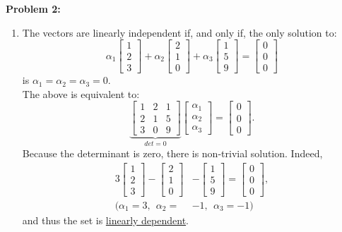 \documentclass[letterpaper]{article}
\begin{document}
\bigskip
\noindent \textbf{Problem 2:}
\begin{enumerate}
\setlength{\itemsep}{.1in}
\renewcommand{\labelenumi}{(\alph{enumi})}

\item The vectors are linearly independent if, and only if, the only solution to: $$\alpha_1 \begin{bmatrix} 1 \\ 2 \\ 3 \end{bmatrix} + \alpha_2 \begin{bmatrix} 2 \\ 1 \\ 0 \end{bmatrix} + \alpha_3 \begin{bmatrix} 1 \\ 5 \\ 9 \end{bmatrix} = \begin{bmatrix} 0 \\ 0 \\ 0 \end{bmatrix}$$
is $\alpha_1 = \alpha_2 = \alpha_3 = 0.$ \\
The above is equivalent to:
$$\underbrace{\left[ \begin{array}{ccc}1 & 2 & 1 \\ 2 & 1 & 5 \\ 3 & 0 & 9 \end{array} \right]}_{det=0} \begin{bmatrix} \alpha_1 \\ \alpha_2 \\ \alpha_3 \end{bmatrix} = \begin{bmatrix} 0 \\ 0 \\ 0 \end{bmatrix}. $$
Because the determinant is zero, there is non-trivial solution. Indeed,
$$\begin{aligned}3\begin{bmatrix} 1\\2\\3 \end{bmatrix} - \begin{bmatrix} 2\\1\\0 \end{bmatrix} &- \begin{bmatrix} 1\\5\\9 \end{bmatrix} = \begin{bmatrix} 0\\0\\0 \end{bmatrix}, \\ (\alpha_1 = 3, ~~\alpha_2 = &-1,~~ \alpha_3 = -1) \end{aligned}$$
and thus the set is \underline{linearly dependent}.


\end{enumerate}
\end{document}
